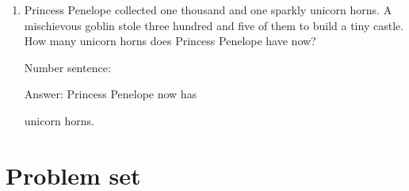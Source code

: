 \documentclass{tufte-book}
\begin{document}
\begin{enumerate}
  \item Princess Penelope collected one thousand and one sparkly unicorn horns.
  A mischievous goblin stole three hundred and five of them to build a tiny castle.
  How many unicorn horns does Princess Penelope have now?\medskip\par
  Number sentence: \dotfill\medskip\par
  Answer: Princess Penelope now has 
  \dotfill\medskip\par\mbox{}\dotfill\medskip\par\mbox{}\dotfill\bigskip
   unicorn horns.  
\end{enumerate}

\clearpage\section{Problem set }
\end{document}
